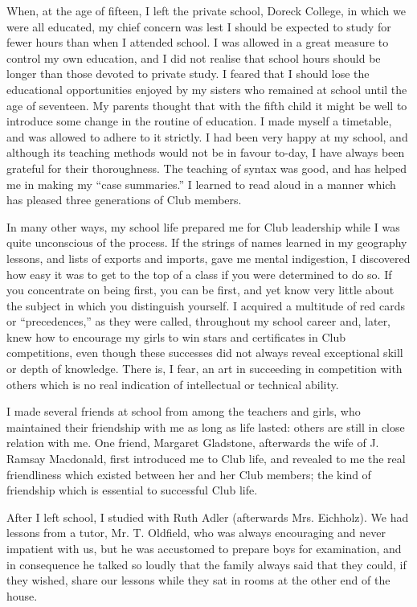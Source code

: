 When, at the age of fifteen, I left the private school,
Doreck College, in which we were all educated, my chief
concern was lest I should be expected to study for fewer
hours than when I attended school. I was allowed in a
great measure to control my own education, and I did
not realise that school hours should be longer than those
devoted to private study. I feared that I should lose the
educational opportunities enjoyed by my sisters who
remained at school until the age of seventeen. My parents
thought that with the fifth child it might be well to introduce
some change in the routine of education. I made
myself a timetable, and was allowed to adhere to it
strictly. I had been very happy at my school, and although
its teaching methods would not be in favour to-day, I
have always been grateful for their thoroughness. The
teaching of syntax was good, and has helped me in making
my “case summaries.” I learned to read aloud in a
manner which has pleased three generations of Club
members.

In many other ways, my school life prepared me for
Club leadership while I was quite unconscious of
the process. If the strings of names learned in
my geography lessons, and lists of exports and imports,
gave me mental indigestion, I discovered how easy it was
to get to the top of a class if you were determined to do so.
If you concentrate on being first, you can be first, and
yet know very little about the subject in which you distinguish
yourself. I acquired a multitude of red cards or
“precedences,” as they were called, throughout my school
career and, later, knew how to encourage my girls to win
stars and certificates in Club competitions, even though
these successes did not always reveal exceptional skill
or depth of knowledge. There is, I fear, an art in
succeeding in competition with others which is no real
indication of intellectual or technical ability.

I made several friends at school from among the
teachers and girls, who maintained their friendship with
me as long as life lasted: others are still in close relation
with me. One friend, Margaret Gladstone, afterwards
the wife of J. Ramsay Macdonald, first introduced me to
Club life, and revealed to me the real friendliness which
existed between her and her Club members; the kind of
friendship which is essential to successful Club life.

After I left school, I studied with Ruth Adler (afterwards
Mrs. Eichholz). We had lessons from a tutor, Mr.
T. Oldfield, who was always encouraging and never impatient
with us, but he was accustomed to prepare boys
for examination, and in consequence he talked so loudly
that the family always said that they could, if they
wished, share our lessons while they sat in rooms at the
other end of the house.

